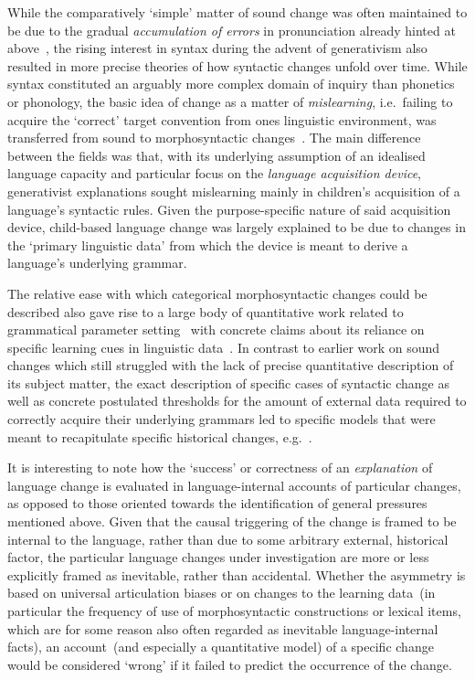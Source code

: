 While the comparatively `simple' matter of sound change was often maintained to be due to the gradual \emph{accumulation of errors} in pronunciation already hinted at above~\citep[see e.g.][for a textbook account of the general principle]{Hockett1958}, the rising interest in syntax during the advent of generativism also resulted in more precise theories of how syntactic changes unfold over time. While syntax constituted an arguably more complex domain of inquiry than phonetics or phonology, the basic idea of change as a matter of \emph{mislearning}, i.e.~failing to acquire the `correct' target convention from ones linguistic environment, was transferred from sound to morphosyntactic changes~\citep{Salmons2013}.
The main difference between the fields was that, with its underlying assumption of an idealised language capacity and particular focus on the \emph{language acquisition device}, generativist explanations sought mislearning mainly in children's acquisition of a language's syntactic rules. Given the purpose-specific nature of said acquisition device, child-based language change was largely explained to be due to changes in the `primary linguistic data' from which the device is meant to derive a language's underlying grammar.

The relative ease with which categorical morphosyntactic changes could be described also gave rise to a large body of quantitative work related to grammatical parameter setting~\citep{Lightfoot1991} with concrete claims about its reliance on specific learning cues in linguistic data~\citep{Gibson1994}.
In contrast to earlier work on sound changes which still struggled with the lack of precise quantitative description of its subject matter, the exact description of specific cases of syntactic change as well as concrete postulated thresholds for the amount of external data required to correctly acquire their underlying grammars led to specific models that were meant to recapitulate specific historical changes, e.g.~\citet{Yang2002}.

It is interesting to note how the `success' or correctness of an \emph{explanation} of language change is evaluated in language-internal accounts of particular changes, as opposed to those oriented towards the identification of general pressures mentioned above.
Given that the causal triggering of the change is framed to be internal to the language, rather than due to some arbitrary external, historical factor, the particular language changes under investigation are more or less explicitly framed as inevitable, rather than accidental.
Whether the asymmetry is based on universal articulation biases or on changes to the learning data~(in particular the frequency of use of morphosyntactic constructions or lexical items, which are for some reason also often regarded as inevitable language-internal facts), an account~(and especially a quantitative model) of a specific change would be considered `wrong' if it failed to predict the occurrence of the change.

